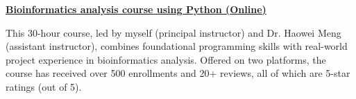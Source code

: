 \textbf{\href{https://www.bioinfo.info/p/t_pc/goods_pc_detail/goods_detail/course_2SvfNlIVzrKfOcexHk9Nute5Bhd}{Bioinformatics analysis course using Python (Online)}}

This 30-hour course, led by myself (principal instructor) and Dr. Haowei Meng (assistant instructor), 
combines foundational programming skills with real-world project experience in bioinformatics analysis. 
Offered on two platforms, the course has received over 500 enrollments and 20+ reviews, 
all of which are 5-star ratings (out of 5).
